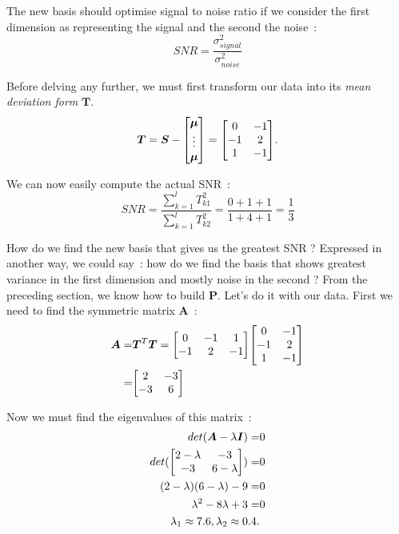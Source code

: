 \documentclass[11pt,twocolumn]{amsart} %
\newcommand{\ve}[1]{\boldsymbol{#1}}
\newcommand{\ma}[1]{\boldsymbol{#1}}
\newenvironment{m}{\begin{bmatrix}}{\end{bmatrix}}
\begin{document}
The new basis should optimise signal to noise ratio if we consider the first dimension as representing the signal and the second the noise~:
\[
  SNR = \frac{\sigma_{signal}^2}{\sigma_{noise}^2}
\]

Before delving any further, we must first transform our data into its \emph{mean deviation form} $\ma{T}$. 
\[
  \ma{T} = \ma{S} - \begin{m}\ve{\mu} \\ \vdots \\ \ve{\mu}\end{m} = \begin{m} 0 & -1 \\ -1 & 2 \\ 1 & -1\end{m}.
\]

We can now easily compute the actual SNR~:
\[
  SNR = \frac{\sum_{k=1}^l T_{k1}^2}{\sum_{k=1}^l T_{k2}^2} = \frac{0+1+1}{1+4+1} = \frac{1}{3}
\]

How do we find the new basis that gives us the greatest SNR ? Expressed in another way, we could say~: how do we find the basis that shows greatest variance in the first dimension and mostly noise in the second ? From the preceding section, we know how to build $\ma{P}$. Let's do it with our data. First we need to find the symmetric matrix $\ma{A}$~:
\begin{align*}
  \ma{A} = & \ma{T}^T\ma{T} = \begin{m} 0 & -1 & 1 \\ -1 & 2 & -1 \end{m} \begin{m} 0 & -1 \\ -1 & 2 \\ 1 & -1\end{m} \\
         = & \begin{m} 2 & -3 \\ -3 & 6 \end{m}
\end{align*}

Now we must find the eigenvalues of this matrix~:
\begin{align*}
  det(\ma{A} - \lambda\ma{I}) = & 0 \\
  det(\begin{m} 2-\lambda & -3 \\ -3 & 6-\lambda \end{m}) = & 0 \\
  (2-\lambda)(6-\lambda) - 9 = & 0 \\
  \lambda^2 - 8\lambda + 3 = & 0 \\
  \lambda_1 \approx 7.6, \lambda_2 \approx 0.4.
\end{align*}
\end{document}
